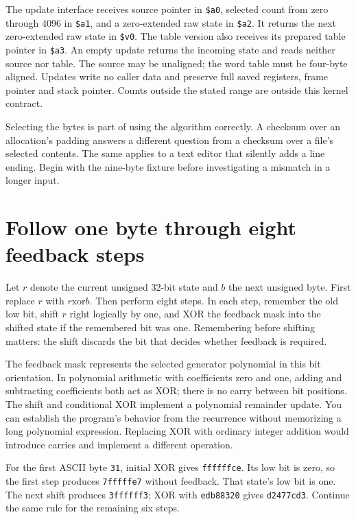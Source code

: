 The update interface receives source pointer in \texttt{\$a0}, selected count
from zero through 4096 in \texttt{\$a1}, and a zero-extended raw state in
\texttt{\$a2}. It returns the next zero-extended raw state in \texttt{\$v0}.
The table version also receives its prepared table pointer in \texttt{\$a3}.
An empty update returns the incoming state and reads neither source nor table.
The source may be unaligned; the word table must be four-byte aligned. Updates
write no caller data and preserve full saved registers, frame pointer and stack
pointer. Counts outside the stated range are outside this kernel contract.

Selecting the bytes is part of using the algorithm correctly. A checksum over
an allocation's padding answers a different question from a checksum over a
file's selected contents. The same applies to a text editor that silently adds
a line ending. Begin with the nine-byte fixture before investigating a mismatch
in a longer input.

\section{Follow one byte through eight feedback steps}

Let $r$ denote the current unsigned 32-bit state and $b$ the next unsigned byte.
First replace $r$ with $r\mathbin{\mathrm{xor}}b$. Then perform eight steps.
In each step, remember the old low bit, shift $r$ right logically by one, and
XOR the feedback mask into the shifted state if the remembered bit was one.
Remembering before shifting matters: the shift discards the bit that decides
whether feedback is required.

The feedback mask represents the selected generator polynomial in this bit
orientation. In polynomial arithmetic with coefficients zero and one, adding
and subtracting coefficients both act as XOR; there is no carry between bit
positions. The shift and conditional XOR implement a polynomial remainder
update. You can establish the program's behavior from the recurrence without
memorizing a long polynomial expression. Replacing XOR with ordinary integer
addition would introduce carries and implement a different operation.

For the first ASCII byte \texttt{31}, initial XOR gives \texttt{ffffffce}.
Its low bit is zero, so the first step produces \texttt{7fffffe7} without
feedback. That state's low bit is one. The next shift produces
\texttt{3ffffff3}; XOR with \texttt{edb88320} gives \texttt{d2477cd3}.
Continue the same rule for the remaining six steps.

